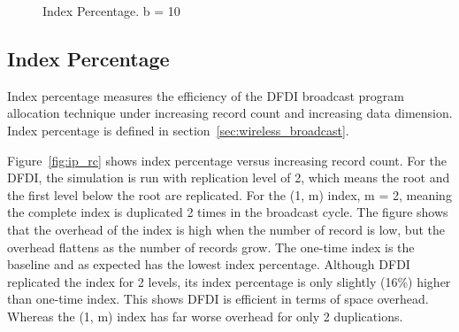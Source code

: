\begin{figure}
  \centering
  \caption{\small Index Percentage. b = 10}
  \label{fig:ip}
\end{figure}


\subsection{Index Percentage}

Index percentage measures the efficiency of the DFDI broadcast program
allocation technique under increasing record count and increasing data
dimension. Index percentage is defined in
section~\ref{sec:wireless_broadcast}.

Figure~\ref{fig:ip_rc} shows index percentage versus increasing record
count. For the DFDI, the simulation is run with replication level of 2,
which means the root and the first level below the root are replicated.
For the (1, m) index, m = 2, meaning the complete index is duplicated
2 times in the broadcast cycle.
The figure shows that the overhead of the index is high when the
number of record is low, but the overhead flattens as the number of
records grow. The one-time index is the baseline and as expected has
the lowest index percentage. Although DFDI replicated the index for
2 levels, its index percentage is only slightly (16\%) higher than
one-time index. This shows DFDI is efficient in terms of space
overhead. Whereas the (1, m) index has far worse overhead for only
2 duplications.

